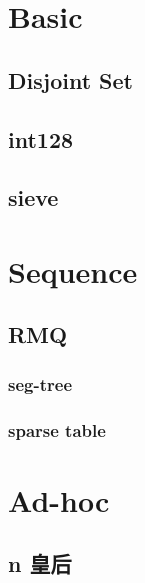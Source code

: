 \section{Basic}

\subsection{Disjoint Set}


\subsection{int128}


\subsection{sieve}


\section{Sequence}

\subsection{RMQ}

\subsubsection{seg-tree}


\subsubsection{sparse table}


\section{Ad-hoc}

\subsection{n 皇后}
